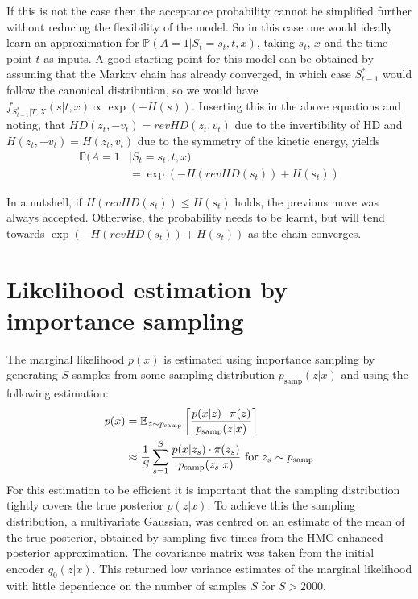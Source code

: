 \begin{appendices}
If this is not the case then the acceptance probability cannot be simplified further without reducing the flexibility of the model. So in this case one would ideally learn an approximation for $\mathbb{P}(A=1|S_t = s_t, t, x)$, taking $s_t$, $x$ and the time point $t$ as inputs. A good starting point for this model can be obtained by assuming that the Markov chain has already converged, in which case $S_{t-1}^*$ would follow the canonical distribution, so we would have $f_{S^*_{t-1}|T, X}(s| t, x) \propto \exp(-H(s))$. Inserting this in the above equations and noting, that $HD(z_t, -v_t) = revHD(z_t, v_t)$ due to the invertibility of HD and $H(z_t, -v_t) = H(z_t, v_t)$ due to the symmetry of the kinetic energy, yields
\begin{equation}
\begin{split}
\mathbb{P}(A = 1&|S_t = s_t, t, x) \\
&= \exp(-H(revHD(s_t)) + H(s_t))
\end{split}
\end{equation}

In a nutshell, if $H(revHD(s_t)) \leq H(s_t)$ holds, the previous move was always accepted. Otherwise, the probability needs to be learnt, but will tend towards $\exp(-H(revHD(s_t)) + H(s_t))$ as the chain converges.

\section{Likelihood estimation by importance sampling}
\label{app:NLLestimateImportSampling}

The marginal likelihood $p(x)$ is estimated using importance sampling by generating $S$ samples from some sampling distribution $p_\textrm{samp}(z|x)$ and using the following estimation:
\begin{equation}
\begin{split}
p(x) &= \mathbb{E}_{z \sim p_\textrm{samp}} \left[\frac{p(x|z) \cdot \pi(z)}{p_\textrm{samp}(z|x)} \right] \\
&\approx \frac{1}{S} \sum_{s=1}^S \frac{p(x|z_s) \cdot \pi(z_s)}{p_\textrm{samp}(z_s|x)} \textrm{ for } z_s \sim p_\textrm{samp}
\end{split}
\end{equation}
For this estimation to be efficient it is important that the sampling distribution tightly covers the true posterior $p(z|x)$. To achieve this the sampling distribution, a multivariate Gaussian, was centred on an estimate of the mean of the true posterior, obtained by sampling five times from the HMC-enhanced posterior approximation. The covariance matrix was taken from the initial encoder $q_0(z|x)$. This returned low variance estimates of the marginal likelihood with little dependence on the number of samples $S$ for $S > 2000$.


\end{appendices}
